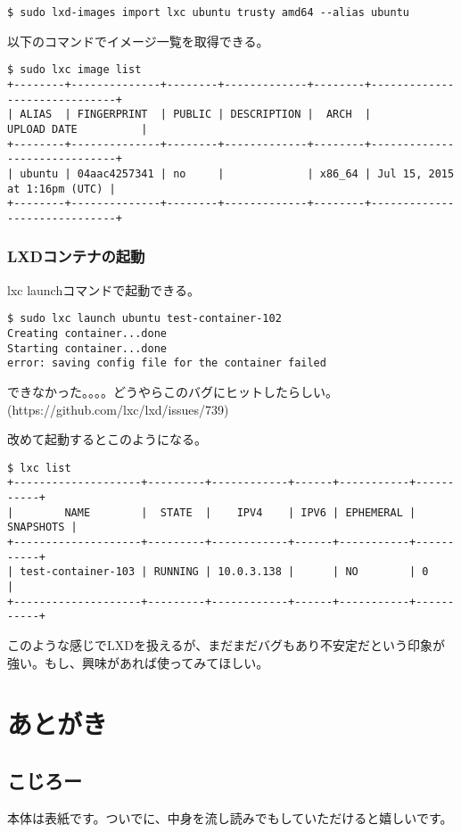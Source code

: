 \documentclass[9pt,b5paper,tombo]{jsbook}
\begin{document}
\begin{lstlisting}
$ sudo lxd-images import lxc ubuntu trusty amd64 --alias ubuntu
\end{lstlisting}

\noindent
以下のコマンドでイメージ一覧を取得できる。
\begin{lstlisting}
$ sudo lxc image list
+--------+--------------+--------+-------------+--------+------------------------------+
| ALIAS  | FINGERPRINT  | PUBLIC | DESCRIPTION |  ARCH  |         UPLOAD DATE          |
+--------+--------------+--------+-------------+--------+------------------------------+
| ubuntu | 04aac4257341 | no     |             | x86_64 | Jul 15, 2015 at 1:16pm (UTC) |
+--------+--------------+--------+-------------+--------+------------------------------+
\end{lstlisting}

\subsection{LXDコンテナの起動}
lxc launchコマンドで起動できる。
\begin{lstlisting}
$ sudo lxc launch ubuntu test-container-102
Creating container...done
Starting container...done
error: saving config file for the container failed
\end{lstlisting}

\noindent
できなかった。。。。どうやらこのバグにヒットしたらしい。(https://github.com/lxc/lxd/issues/739)

\noindent
改めて起動するとこのようになる。
\begin{lstlisting}
$ lxc list
+--------------------+---------+------------+------+-----------+-----------+
|        NAME        |  STATE  |    IPV4    | IPV6 | EPHEMERAL | SNAPSHOTS |
+--------------------+---------+------------+------+-----------+-----------+
| test-container-103 | RUNNING | 10.0.3.138 |      | NO        | 0         |
+--------------------+---------+------------+------+-----------+-----------+
\end{lstlisting}

\noindent
このような感じでLXDを扱えるが、まだまだバグもあり不安定だという印象が強い。もし、興味があれば使ってみてほしい。

\chapter{あとがき}

\section{こじろー}
本体は表紙です。ついでに、中身を流し読みでもしていただけると嬉しいです。
\end{document}
